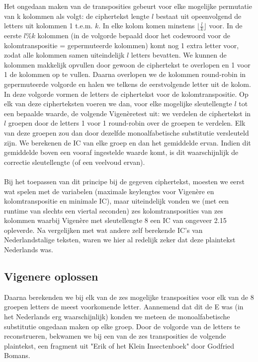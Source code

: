 Het ongedaan maken van de transposities gebeurt voor elke mogelijke permutatie van k kolommen als volgt: de ciphertekst lengte $l$ bestaat uit opeenvolgend de letters uit kolommen 1 t.e.m. $k$. In elke kolom komen minstens $\lfloor\frac{l}{k}\rfloor$ voor. In de eerste $l\%k$ kolommen (in de volgorde bepaald door het codewoord voor de kolomtranspositie = gepermuteerde kolommen) komt nog 1 extra letter voor, zodat alle kolommen samen uiteindelijk $l$ letters bevatten. We kunnen de kolommen makkelijk opvullen door gewoon de ciphertekst te overlopen en 1 voor 1 de kolommen op te vullen. Daarna overlopen we de kolommen round-robin in gepermuteerde volgorde en halen we telkens de eerstvolgende letter uit de kolom. In deze volgorde vormen de letters de ciphertekst voor de kolomtranspositie. Op elk van deze cipherteksten voeren we dan, voor elke mogelijke sleutellengte $l$ tot een bepaalde waarde, de volgende Vigen\`eretest uit: we verdelen de ciphertekst in $l$ groepen door de letters 1 voor 1 round-robin over de groepen te verdelen. Elk van deze groepen zou dan door dezelfde monoalfabetische substitutie versleuteld zijn. We berekenen de IC van elke groep en dan het gemiddelde ervan. Indien dit gemiddelde boven een vooraf ingestelde waarde komt, is dit waarschijnlijk de correctie sleutellengte (of een veelvoud ervan). \\ \\ Bij het toepassen van dit principe bij de gegeven ciphertekst, moesten we eerst wat spelen met de variabelen (maximale keylengtes voor Vigen\`ere en kolomtranspositie en minimale IC), maar uiteindelijk vonden we (met een runtime van slechts een viertal seconden) zes kolomtransposities van zes kolommen waarbij Vigen\`ere met sleutellengte 8 een IC van ongeveer 2.15 opleverde. Na vergelijken met wat andere zelf berekende IC's van Nederlandstalige teksten, waren we hier al redelijk zeker dat deze plaintekst Nederlands was. 

\subsection{Vigenere oplossen}
Daarna berekenden we bij elk van de zes mogelijke transposities voor elk van de 8 groepen letters de meest voorkomende letter. Aannemend dat dit de E was (in het Nederlands erg waarschijnlijk) konden we meteen de monoalfabetische substitutie ongedaan maken op elke groep. Door de volgorde van de letters te reconstrueren, bekwamen we bij een van de zes transposities de volgende plaintekst, een fragment uit "Erik of het Klein Insectenboek" door Godfried Bomans.


